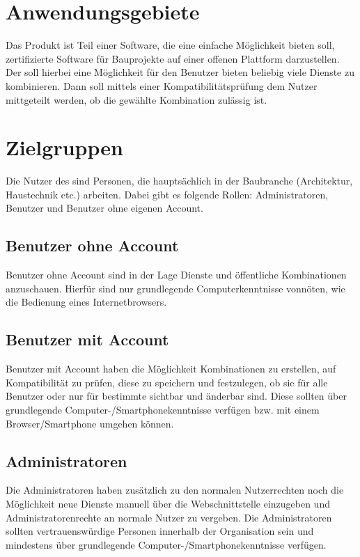 
\section{Anwendungsgebiete}\label{sec:Anwendungsgebiete}
Das Produkt \projektname ist Teil einer Software, die eine einfache Möglichkeit bieten soll, zertifizierte Software für Bauprojekte auf einer offenen Plattform darzustellen.
Der \projektname soll hierbei eine Möglichkeit für den Benutzer bieten beliebig viele Dienste zu kombinieren.
Dann soll mittels einer Kompatibilitätsprüfung dem Nutzer mittgeteilt werden, ob die gewählte Kombination zulässig ist.


\section{Zielgruppen}\label{sec:Zielgruppen}

Die Nutzer des \projektname sind Personen, die hauptsächlich in der Baubranche (Architektur, Haustechnik etc.) arbeiten.
Dabei gibt es folgende Rollen: Administratoren, Benutzer und Benutzer ohne eigenen Account.

\subsection{Benutzer ohne Account}
Benutzer ohne Account sind in der Lage Dienste und öffentliche Kombinationen anzuschauen. Hierfür sind nur grundlegende Computerkenntnisse vonnöten, wie die Bedienung eines Internetbrowsers.

\subsection{Benutzer mit Account}
Benutzer mit Account haben die Möglichkeit Kombinationen zu erstellen, auf Kompatibilität zu prüfen, diese zu speichern und festzulegen, ob sie für alle Benutzer oder nur für bestimmte sichtbar und änderbar sind.
Diese sollten über grundlegende Computer-/Smartphonekenntnisse verfügen bzw. mit einem Browser/Smartphone umgehen können.

\subsection{Administratoren}
Die Administratoren haben zusätzlich zu den normalen Nutzerrechten noch die Möglichkeit neue Dienste manuell über die Webschnittstelle einzugeben und
Administratorenrechte an normale Nutzer zu vergeben. Die Administratoren sollten vertrauenswürdige Personen innerhalb der Organisation sein und mindestens über grundlegende Computer-/Smartphonekenntnisse verfügen.


